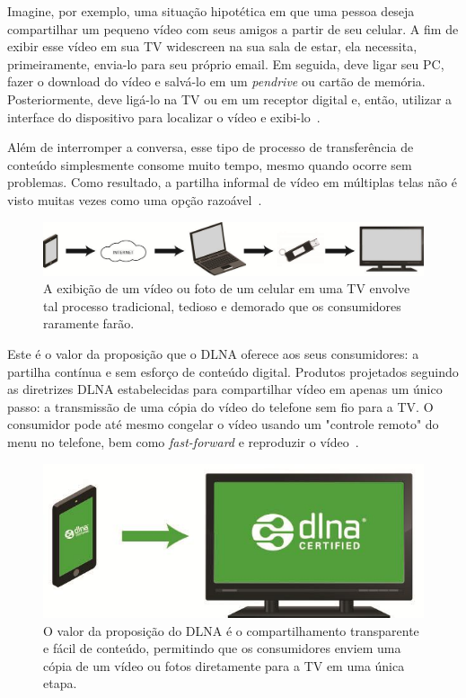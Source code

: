 Imagine, por exemplo, uma situação hipotética em que uma pessoa deseja compartilhar um pequeno vídeo com seus amigos a partir de seu celular. A fim de exibir esse vídeo em sua TV widescreen na sua sala de estar, ela necessita, primeiramente, envia-lo para seu próprio email. Em seguida, deve ligar seu PC, fazer o download do vídeo e salvá-lo em um \emph{pendrive} ou cartão de memória. Posteriormente, deve ligá-lo na TV ou em um receptor digital e, então, utilizar a interface do dispositivo para localizar o vídeo e exibi-lo~\cite{dlnahdvideostreaming}.

Além de interromper a conversa, esse tipo de processo de transferência de conteúdo simplesmente consome muito tempo, mesmo quando ocorre sem problemas. Como resultado, a partilha informal de vídeo em múltiplas telas não é visto muitas vezes como uma opção razoável~\cite{dlnahdvideostreaming}.

\begin{figure}[ht]
	\center
	\includegraphics[scale=0.3]{imagens/dlna1}
	\caption{A exibição de um vídeo ou foto de um celular em uma TV envolve tal processo tradicional, tedioso e demorado que os consumidores raramente farão.}
	\label{fig:traditionalProccess}
\end{figure}

Este é o valor da proposição que o DLNA oferece aos seus consumidores: a partilha contínua e sem esforço de conteúdo digital. Produtos projetados seguindo as diretrizes DLNA estabelecidas para compartilhar vídeo em apenas um único passo: a transmissão de uma cópia do vídeo do telefone sem fio para a TV. O consumidor pode até mesmo congelar o vídeo usando um "controle remoto" do menu no telefone, bem como \emph{fast-forward} e reproduzir o vídeo~\cite{dlnahdvideostreaming}.

\begin{figure}[ht]
	\center
	\includegraphics[scale=0.3]{imagens/dlna2}
	\caption{O valor da proposição do DLNA é o compartilhamento transparente e fácil de conteúdo, permitindo que os consumidores enviem uma cópia de um vídeo ou fotos diretamente para a TV em uma única etapa.}
	\label{fig:dlnaProccess}
\end{figure}

